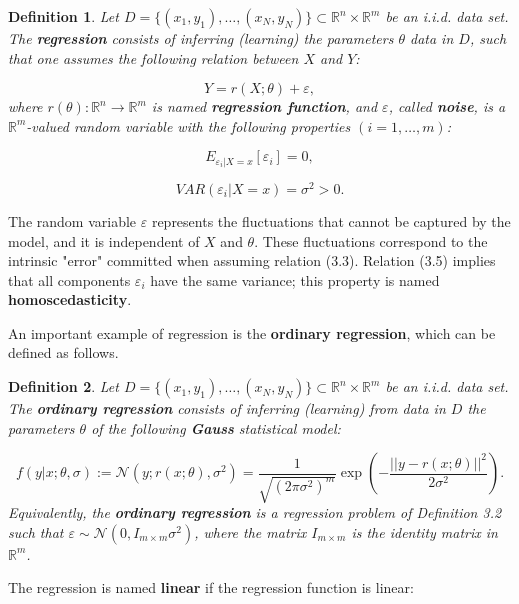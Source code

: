 \documentclass{report}
\newtheorem{definition}{Definition}[chapter]
\begin{document}
\begin{definition}
Let $D = \{(x_1,y_1),\dots,(x_N,y_N)\} \subset \mathbb{R}^n \times \mathbb{R}^m$ be an i.i.d. data set. The \textbf{regression} consists of inferring (learning) the parameters $\theta$ data in $D$, such that one assumes the following relation between $X$ and $Y$:

\begin{equation}
Y = r(X;\theta) + \varepsilon,
\end{equation}
where $r(\theta) : \mathbb{R}^n \to \mathbb{R}^m$ is named \textbf{regression function}, and $\varepsilon$, called \textbf{noise}, is a $\mathbb{R}^m$-valued random variable with the following properties $(i = 1,\dots,m)$:

\begin{equation}
E_{\varepsilon_i|X = x}[\varepsilon_i] = 0,
\end{equation}

\begin{equation}
VAR(\varepsilon_i|X = x) = \sigma^2 > 0.
\end{equation}
\end{definition}
The random variable $\varepsilon$ represents the fluctuations that cannot be captured by the model, and it is independent of $X$ and $\theta$. These fluctuations correspond to the intrinsic "error" committed when assuming relation (3.3). Relation (3.5) implies that all components $\varepsilon_i$ have the same variance; this property is named \textbf{homoscedasticity}.

An important example of regression is the \textbf{ordinary regression}, which can be defined as follows.

\begin{definition}
Let $D = \{(x_1,y_1),\dots,(x_N,y_N)\} \subset \mathbb{R}^n \times \mathbb{R}^m$ be an i.i.d. data set. The \textbf{ordinary regression} consists of inferring (learning) from data in $D$ the parameters $\theta$ of the following \textbf{Gauss} statistical model:

\begin{equation}
f(y|x;\theta,\sigma) := \mathcal{N}(y;r(x;\theta),\sigma^2) = \frac{1}{\sqrt{(2\pi\sigma^2)^m}}\exp\left(-\frac{||y-r(x;\theta)||^2}{2\sigma^2}\right).
\end{equation}
Equivalently, the \textbf{ordinary regression} is a regression problem of Definition 3.2 such that $\varepsilon \sim \mathcal{N}(0,I_{m\times m}\sigma^2)$, where the matrix $I_{m\times m}$ is the identity matrix in $\mathbb{R}^m$.
\end{definition}
The regression is named \textbf{linear} if the regression function is linear:
\end{document}
